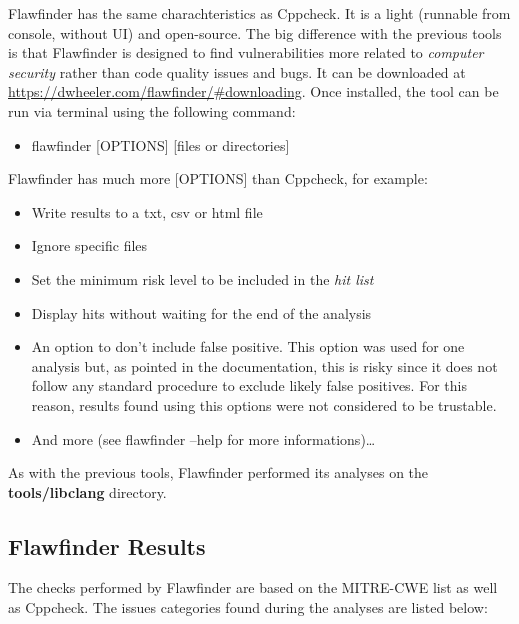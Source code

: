 Flawfinder has the same charachteristics as Cppcheck. It is a light (runnable from console, without UI) and open-source.\newline
The big difference with the previous tools is that Flawfinder is designed to find vulnerabilities more related to \textsl{computer security} rather than code quality issues and bugs.\newline
It can be downloaded at \url{https://dwheeler.com/flawfinder/#downloading}.\newline
Once installed, the tool can be run via terminal using the following command:
\begin{itemize}
	\item flawfinder [OPTIONS] [files or directories]
\end{itemize}

Flawfinder has much more [OPTIONS] than Cppcheck, for example:\begin{itemize}
	\item Write results to a txt, csv or html file
	\item Ignore specific files
	\item Set the minimum risk level to be included in the \textsl{hit list}
	\item Display hits without waiting for the end of the analysis
	\item An option to don't include false positive. This option was used for one analysis but, as pointed in the documentation, this is risky since it does not follow any standard procedure to exclude likely false positives. For this reason, results found using this options were not considered to be trustable.
	\item And more (see flawfinder --help for more informations)\dots
\end{itemize}

As with the previous tools, Flawfinder performed its analyses on the \textbf{tools/libclang} directory.

\subsection{Flawfinder Results}

The checks performed by Flawfinder are based on the MITRE-CWE list as well as Cppcheck.\newline
The issues categories found during the analyses are listed below:

